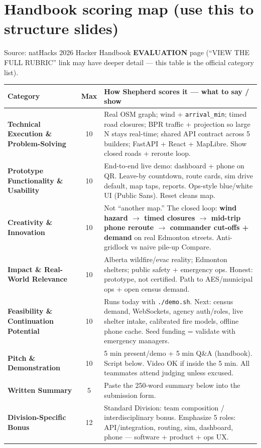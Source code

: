 \documentclass[10pt]{extarticle}
\begin{document}
\section{Handbook scoring map (use this to structure slides)}
Source: natHacks 2026 Hacker Handbook \textbf{EVALUATION} page (``VIEW THE FULL RUBRIC'' link may have deeper detail --- this table is the official category list).

\begin{tabularx}{\textwidth}{@{}>{\bfseries}p{}cX@{}}
\toprule
Category & Max & How Shepherd scores it --- what to say / show \\
\midrule
Technical Execution \& Problem-Solving & 10 & Real OSM graph; wind + \texttt{arrival\_min}; timed road closures; BPR traffic + projection so large N stays real-time; shared API contract across 5 builders; FastAPI + React + MapLibre. Show closed roads + reroute loop. \\
Prototype Functionality \& Usability & 10 & End-to-end live demo: dashboard + phone on QR. Leave-by countdown, route cards, sim drive default, map taps, reports. Ops-style blue/white UI (Public Sans). Reset cleans map. \\
Creativity \& Innovation & 10 & Not ``another map.'' The closed loop: \textbf{wind hazard $\rightarrow$ timed closures $\rightarrow$ mid-trip phone reroute $\rightarrow$ commander cut-offs + demand} on real Edmonton streets. Anti-gridlock vs naive pile-up Compare. \\
Impact \& Real-World Relevance & 10 & Alberta wildfire/evac reality; Edmonton shelters; public safety + emergency ops. Honest: prototype, not certified. Path to AES/municipal ops + open census demand. \\
Feasibility \& Continuation Potential & 10 & Runs today with \texttt{./demo.sh}. Next: census demand, WebSockets, agency auth/roles, live shelter intake, calibrated fire models, offline phone cache. Seed funding = validate with emergency managers. \\
Pitch \& Demonstration & 10 & 5 min present/demo + 5 min Q\&A (handbook). Script below. Video OK if inside the 5 min. All teammates attend judging unless excused. \\
Written Summary & 5 & Paste the 250-word summary below into the submission form. \\
Division-Specific Bonus & 12 & Standard Division: team composition / interdisciplinary bonus. Emphasize 5 roles: API/integration, routing, sim, dashboard, phone --- software + product + ops UX. \\
\bottomrule
\end{tabularx}
\end{document}
